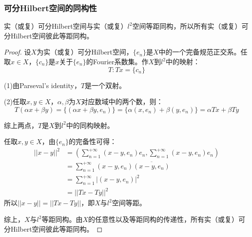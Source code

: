 \subsubsection{可分Hilbert空间的同构性}
\begin{theorem}
	实（或复）可分Hilbert空间与实（或复）$l^2$空间等距同构，所以所有实（或复）可分Hilbert空间彼此等距同构。
\end{theorem}
\begin{proof}
	设$X$为实（或复）可分Hilbert空间，$\{e_n\}$是$X$中的一个完备规范正交系。任取$x\in X$，$\{c_n\}$是$x$关于$\{e_n\}$的Fourier系数集。作$X$到$l^2$中的映射：
	\begin{equation*}
		T:Tx=\{c_n\}
	\end{equation*}\par
	(1)由Parseval's identity，$T$是一个双射。\par
	(2)任取$x,y\in X$，$\alpha,\beta$为$X$对应数域中的两个数，则：
	\begin{equation*}
		T(\alpha x+\beta y)=\{(\alpha x+\beta y,e_n)\}=\{\alpha(x,e_n)+\beta(y,e_n)\}=\alpha Tx+\beta Ty
	\end{equation*}\par
	综上两点，$T$是$X$到$l^2$中的同构映射。\par
	任取$x,y\in X$，由$\{e_n\}$的完备性可得：
	\begin{align*}
		||x-y||^2
		&=\left(\sum_{n=1}^{+\infty}(x-y,e_n)e_n,\sum_{n=1}^{+\infty}(x-y,e_n)e_n\right) \\
		&=\sum_{n=1}^{+\infty}(x-y,e_n)\overline{(x-y,e_n)} \\
		&=\sum_{n=1}^{+\infty}|(x-y,e_n)|^2 \\
		&=||Tx-Ty||^2
	\end{align*}
	所以$||x-y||=||Tx-Ty||$，即$X$与$l^2$空间等距。\par
	综上，$X$与$l^2$等距同构。由$X$的任意性以及等距同构的传递性，所有实（或复）可分Hilbert空间彼此等距同构。
\end{proof}


















